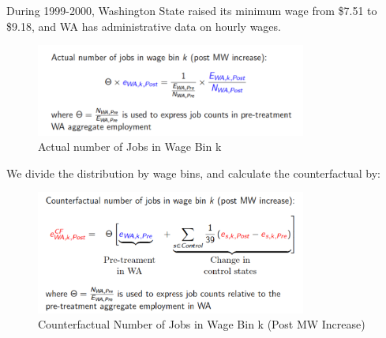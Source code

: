         During 1999-2000, Washington State raised its minimum wage from \$7.51 to \$9.18, and WA has administrative data on hourly wages. 
        \begin{figure}[H]
            \centering
            \includegraphics[width=3.5in]{Screenshot 2023-04-14 113517.png}
            \caption{Actual number of Jobs in Wage Bin k}
        \end{figure}
        We divide the distribution by wage bins, and calculate the counterfactual by:
        \begin{figure}[H]
            \centering
            \includegraphics[width=3.5in]{Screenshot 2023-04-14 114001.png}
            \caption{Counterfactual Number of Jobs in Wage Bin k (Post MW Increase)}
        \end{figure}
        
